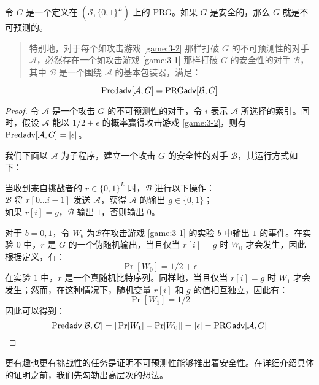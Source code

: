 \begin{theorem}
令 $G$ 是一个定义在 $(\mathcal{S},\{0,1\}^L)$ 上的 PRG。如果 $G$ 是安全的，那么 $G$ 就是不可预测的。
\begin{quote}
特别地，对于每个如攻击游戏 \ref{game:3-2} 那样打破 $G$ 的不可预测性的对手 $\mathcal{A}$，必然存在一个如攻击游戏 \ref{game:3-1} 那样打破 $G$ 的安全性的对手 $\mathcal{B}$，其中 $\mathcal{B}$ 是一个围绕 $\mathcal{A}$ 的基本包装器，满足：
\end{quote}
\[
{\rm Pred\mathsf{adv}}[\mathcal{A},G]={\rm PRG\mathsf{adv}}[\mathcal{B},G]
\]
\end{theorem}

\begin{proof}
令 $\mathcal{A}$ 是一个攻击 $G$ 的不可预测性的对手，令 $i$ 表示 $\mathcal{A}$ 所选择的索引。同时，假设 $\mathcal{A}$ 能以 ${1}/{2}+\epsilon$ 的概率赢得攻击游戏 \ref{game:3-2}，则有${\rm Pred\mathsf{adv}}[\mathcal{A},G]=|\epsilon|$。

我们下面以 $\mathcal{A}$ 为子程序，建立一个攻击 $G$ 的安全性的对手 $\mathcal{B}$，其运行方式如下：

\vspace*{5pt}

\hspace*{5pt} 当收到来自挑战者的 $r\in\{0,1\}^L$ 时，$\mathcal B$ 进行以下操作：\\
\hspace*{50pt} $\mathcal{B}$ 将 $r[0\dots i-1]$ 发送 $\mathcal{A}$，获得 $\mathcal{A}$ 的输出 $g\in\{0,1\}$；\\
\hspace*{50pt} 如果 $r[i]=g$，$\mathcal{B}$ 输出 $1$，否则输出 $0$。

\vspace*{5pt}

对于 $b=0,1$，令 $W_b$ 为$\mathcal{B}$在攻击游戏 \ref{game:3-1} 的实验 $b$ 中输出 $1$ 的事件。在实验 $0$ 中，$r$ 是 $G$ 的一个伪随机输出，当且仅当 $r[i]=g$ 时 $W_0$ 才会发生，因此根据定义，有：
\[
\Pr[W_0]={1}/{2}+\epsilon
\]
在实验 $1$ 中，$r$ 是一个真随机比特序列。同样地，当且仅当 $r[i]=g$ 时 $W_1$ 才会发生；然而，在这种情况下，随机变量 $r[i]$ 和 $g$ 的值相互独立，因此有：
\[
\Pr[W_1]={1}/{2}
\]
因此可以得到：
\[
{\rm Pred\mathsf{adv}}[\mathcal{B},G]=|\Pr[W_1]-\Pr[W_0]|=|\epsilon|={\rm PRG\mathsf{adv}}[\mathcal{A},G]\qedhere
\]
\end{proof}

更有趣也更有挑战性的任务是证明不可预测性能够推出着安全性。在详细介绍具体的证明之前，我们先勾勒出高层次的想法。

